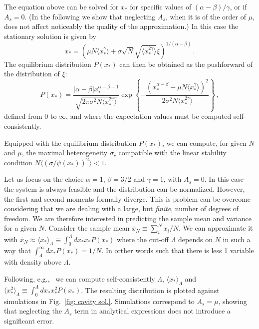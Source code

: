 \documentclass[
 prl,
 twocolumn,
 amsmath,
 amssymb,
 aps,
]{revtex4-2}
\begin{document}
The equation above can be solved for $x_*$ for specific values of
$(\alpha-\beta)/\gamma$, or if $A_s=0$.
(In the following we show that neglecting $A_s$, when it is of the order of $\mu$, does not affect noticeably the quality of the approximation.) In this case the stationary solution is given by 
\begin{equation} \label{eq: cavity solution}
    x_* = \left( \mu N \langle x_*^{\gamma}\rangle + \sigma \sqrt{N} \sqrt{\langle x_*^{2\gamma}\rangle}\xi\right)^{1/(\alpha-\beta)} \, .
\end{equation}
The equilibrium distribution $P(x_*)$ can then be obtained as the pushforward of the distribution of $\xi$: 
\begin{equation}\label{eq: dist general}
    P(x_*)=\frac{|\alpha-\beta|x_*^{\alpha-\beta-1}}{\sqrt{2\pi\sigma^2N \langle x_*^{2\gamma}\rangle}}
    \exp{\left\{-\frac{(x_*^{\alpha-\beta}- \mu N \langle x_*^{\gamma}\rangle)^2}{2\sigma^2N\langle x_*^{2\gamma}\rangle}\right\}} \, ,
\end{equation}
defined from $0$  to $\infty$, and where the expectation values must be computed self-consistently.

Equipped with the equilibrium distribution $P(x_*)$, we can compute, for given $N$ and $\mu$, the maximal heterogeneity $\sigma_c$ compatible with the linear stability condition $N\langle (\sigma/\psi(x_*))^2\rangle < 1$.

Let us focus on the choice $\alpha=1$, $\beta=3/2$ and $\gamma=1$, with $A_s=0$.  
In this case the system is always feasible and the distribution can be normalized. However, the first and second moments formally diverge.
This is problem can be overcome considering that we are dealing with a large, but \emph{finite}, number of degrees of freedom. 
We are therefore interested in predicting the sample mean and variance for a given $N$. Consider the sample mean $\bar{x}_{N}\equiv\sum_{i}^N x_i /N$. We can approximate it with $\bar{x}_N \approx \langle x_* \rangle_{\Lambda} \equiv \int_0^{\Lambda}dx_*x_*P(x_*)$ where the cut-off $\Lambda$ depends on $N$ in such a way that $\int_{\Lambda}^{\infty}dx_*P(x_*)=1/N$. In orther words such that there is less 1 variable with density above $\Lambda$.

Following, e.g.,~\cite{Cui2020,Hatton2024} we can compute self-consistently $\Lambda$, $\langle x_*\rangle_{\Lambda}$ and $\langle x_*^2\rangle_{\Lambda}\equiv\int_0^{\Lambda}dx_*x_*^2P(x_*)$. The resulting distribution is plotted against simulations in Fig.~\ref{fig: cavity sol.}. Simulations correspond to $A_s=\mu$, showing that neglecting the $A_s$ term in analytical expressions does not introduce a significant error. 
\end{document}
